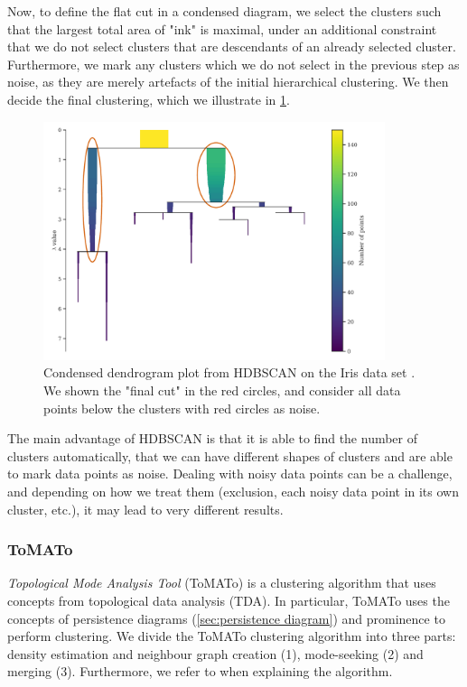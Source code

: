 Now, to define the flat cut in a condensed diagram, we select the clusters such that the largest total area of "ink" is maximal, under an additional constraint that we do not select clusters that are descendants of an already selected cluster. Furthermore, we mark any clusters which we do not select in the previous step as noise, as they are merely artefacts of the initial hierarchical clustering. We then decide the final clustering, which we illustrate in \cref{fig:hdbscan-condensed-dendrogram-final-cut-example}.
\begin{figure}[H]
    \centering
    \includegraphics[width=10cm]{thesis/figures/hdbscan-condensed-tree-final-cut-example.pdf}
    \caption{Condensed dendrogram plot from HDBSCAN on the Iris data set \cite{Fisher1936}. We shown the "final cut" in the red circles, and consider all data points below the clusters with red circles as noise.}
    \label{fig:hdbscan-condensed-dendrogram-final-cut-example}
\end{figure}

The main advantage of HDBSCAN is that it is able to find the number of clusters automatically, that we can have different shapes of clusters and are able to mark data points as noise. Dealing with noisy data points can be a challenge, and depending on how we treat them (exclusion, each noisy data point in its own cluster, etc.), it may lead to very different results.

\subsubsection{ToMATo}
\label{sec:tomato-clustering}
\textit{Topological Mode Analysis Tool} (ToMATo) \cite[2. ToMATo]{Oudot2015} is a clustering algorithm that uses concepts from topological data analysis (TDA). In particular, ToMATo uses the concepts of persistence diagrams (\cref{sec:persistence diagram}) and prominence to perform clustering. We divide the ToMATo clustering algorithm into three parts: density estimation and neighbour graph creation (1), mode-seeking (2) and merging (3). Furthermore, we refer to \cite[2. ToMATo]{Oudot2015} when explaining the algorithm.


